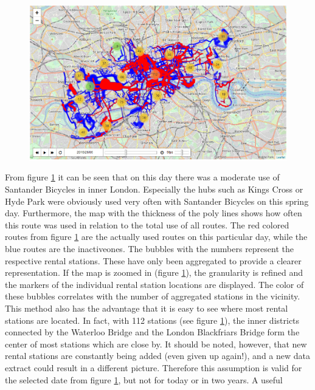 \begin{figure}[H]
\includegraphics[width=1\textwidth]{img/figure4_folium_plot1}\label{fig:figure4_folium_plot1}
\label{fig:figure4_folium_plot1}
\end{figure}
From figure \ref{fig:figure4_folium_plot1} it can be seen that on this day there was a moderate use of Santander Bicycles in
inner London. Especially the hubs such as Kings Cross or Hyde Park were obviously used very
often with Santander Bicycles on this spring day. Furthermore, the map with the thickness of the
poly lines shows how often this route was used in relation to the total use of all routes. The red
colored routes from figure \ref{fig:figure4_folium_plot1} are the actually used routes on this particular day, while the blue
routes are the \glqq inactive\grqq ones. The bubbles with the numbers represent the respective rental
stations. These have only been aggregated to provide a clearer representation. If the map is
zoomed in (figure \ref{fig:figure4_folium_plot1}), the granularity is refined and the markers of the individual rental station
locations are displayed. The color of these bubbles correlates with the number of aggregated
stations in the vicinity. This method also has the advantage that it is easy to see where most rental
stations are located. In fact, with 112 stations (see figure \ref{fig:figure4_folium_plot1}), the inner districts connected by the
Waterloo Bridge and the London Blackfriars Bridge form the center of most stations which are
close by. It should be noted, however, that new rental stations are constantly being added (even
given up again!), and a new data extract could result in a different picture. Therefore this assumption is valid for the selected date from figure \ref{fig:figure4_folium_plot1}, but not for today or in two years. A useful
